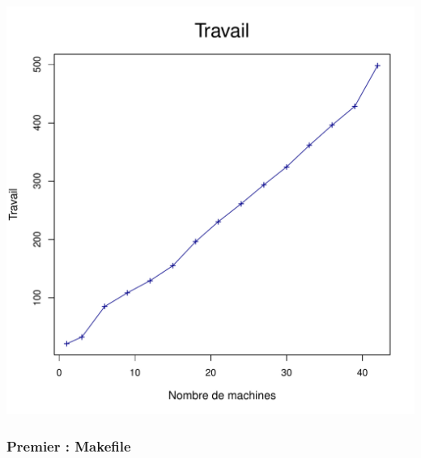 \documentclass[a4paper, 11pt, titlepage]{article}
\begin{document}
\begin{center}
    \includegraphics[scale=0.45]{res/sujet_makefiles_blender_249_Makefile_nth8_work.pdf}
\end{center}



\subsubsection {Premier : Makefile}
\end{document}

